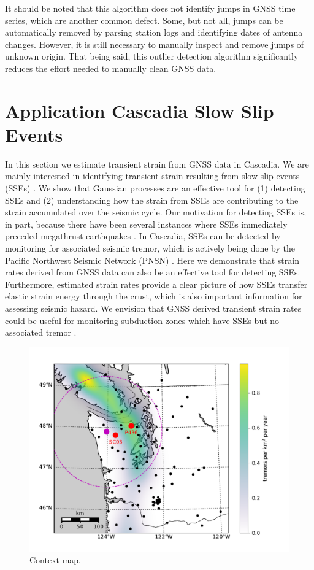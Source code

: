 \documentclass[10pt,a4paper]{article}
\begin{document}
It should be noted that this algorithm does not identify jumps in GNSS time series, which are another common defect. Some, but not all, jumps can be automatically removed by parsing station logs and identifying dates of antenna changes. However, it is still necessary to manually inspect and remove jumps of unknown origin. That being said, this outlier detection algorithm significantly reduces the effort needed to manually clean GNSS data.       

\section{Application Cascadia Slow Slip Events}\label{sec:Cascadia}
In this section we estimate transient strain from GNSS data in Cascadia. We are mainly interested in identifying transient strain resulting from slow slip events (SSEs) \citep[e.g.,][]{Dragert2001}. We show that Gaussian processes are an effective tool for (1) detecting SSEs and (2) understanding how the strain from SSEs are contributing to the strain accumulated over the seismic cycle. Our motivation for detecting SSEs is, in part, because there have been several instances where SSEs immediately preceded megathrust earthquakes \citep{Roeloffs2006}.  In Cascadia, SSEs can be detected by monitoring for associated seismic tremor, which is actively being done by the Pacific Northwest Seismic Network (PNSN) \citep{Wech2010}. 
Here we demonstrate that strain rates derived from GNSS data can also be an effective tool for detecting SSEs. Furthermore, estimated strain rates provide a clear picture of how SSEs transfer elastic strain energy through the crust, which is also important information for assessing seismic hazard. We envision that GNSS derived transient strain rates could be useful for monitoring subduction zones which have SSEs but no associated tremor \citep{Schwartz2007}.

\begin{figure}
\includegraphics{figures/context_map/context-map.pdf}
\caption{Context map.}   
\label{fig:Context}
\end{figure}
\end{document}
